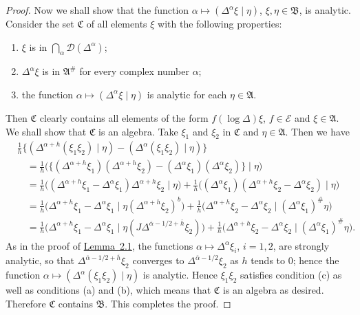\documentclass[12pt,b5paper,twoside]{article}
\theoremstyle{takesaki}
\numberwithin{equation}{section}
\begin{document}
\begin{proof}
Now we shall show that the function
$\alpha\mapsto(\Delta^\alpha\xi\mid\eta)$,
$\xi,\eta\in\mathfrak B$, is
analytic.  Consider the set $\mathfrak C$ of all elements $\xi$ with
the following properties:
\begin{enumerate}[label=(\alph*)]
 \item $\xi$ is in $\bigcap_\alpha\mathcal D(\Delta^\alpha)$;
 \item $\Delta^\alpha\xi$ is in $\mathfrak A^{\#}$ for every complex
 number $\alpha$;
 \item the function $\alpha\mapsto(\Delta^\alpha\xi\mid\eta)$ is
 analytic for each $\eta\in\mathfrak A$.
\end{enumerate}
Then $\mathfrak C$ clearly contains all elements of the form
$f(\log\Delta)\xi$, $f\in\mathcal E$ and $\xi\in\mathfrak A$.  We
shall show that $\mathfrak C$ is an algebra.  Take $\xi_1$ and
$\xi_2$ in $\mathfrak C$ and $\eta\in\mathfrak A$.  Then we have
\begin{align*}
 &\frac1h\{(\Delta^{\alpha+h}(\xi_1\xi_2)\mid\eta)
 -(\Delta^\alpha(\xi_1\xi_2)\mid\eta)\}\\
 &\quad=\frac1h\bigl(\{(\Delta^{\alpha+h}\xi_1)
   (\Delta^{\alpha+h}\xi_2)
  -(\Delta^\alpha\xi_1)(\Delta^\alpha\xi_2)\}\mid\eta\bigr)\\
 &\quad=\frac1h\bigl((\Delta^{\alpha+h}\xi_1-\Delta^\alpha\xi_1)
       \Delta^{\alpha+h}\xi_2\mid\eta\bigr)
  +\frac1h\bigl((\Delta^\alpha\xi_1)
       (\Delta^{\alpha+h}\xi_2-\Delta^\alpha\xi_2)\mid\eta\bigr)\\
 &\quad=\frac1h\bigl(\Delta^{\alpha+h}\xi_1-\Delta^\alpha\xi_1
       \mid\eta(\Delta^{\alpha+h}\xi_2)^b\bigr)
  +\frac1h\bigl(\Delta^{\alpha+h}\xi_2-\Delta^\alpha\xi_2
       \mid(\Delta^\alpha\xi_1)^{\#}\eta\bigr)\\
 &\quad=\frac1h\bigl(\Delta^{\alpha+h}\xi_1-\Delta^\alpha\xi_1
       \mid\eta(J\Delta^{\overline\alpha-1/2+\overline h}\xi_2)\bigr)
  +\frac1h\bigl(\Delta^{\alpha+h}\xi_2-\Delta^\alpha\xi_2
       \mid(\Delta^\alpha\xi_1)^{\#}\eta\bigr).
\end{align*}
As in the proof of \hyperref[lem:2.1]{Lemma~2.1}, the functions
$\alpha\mapsto\Delta^\alpha\xi_i$, $i=1,2$, are strongly analytic, so
that $\Delta^{\overline\alpha-1/2+\overline h}\xi_2$ converges to
$\Delta^{\overline\alpha-1/2}\xi_2$ as $h$ tends to $0$; hence the
function $\alpha\mapsto(\Delta^\alpha(\xi_1\xi_2)\mid\eta)$ is
analytic.  Hence $\xi_1\xi_2$ satisfies condition (c) as well as
conditions (a) and (b), which means that $\mathfrak C$ is an algebra
as desired.  Therefore $\mathfrak C$ contains $\mathfrak B$.  This
completes the proof.
\end{proof}
\end{document}
